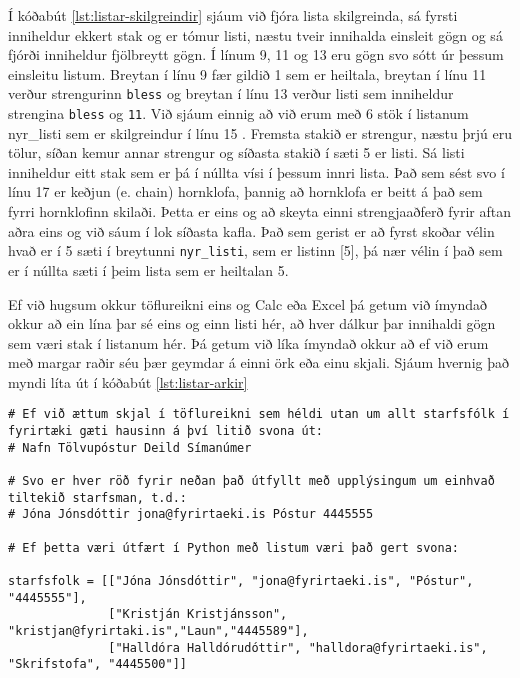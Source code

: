 Í kóðabút \ref{lst:listar-skilgreindir} sjáum við fjóra lista skilgreinda, sá fyrsti inniheldur ekkert stak og er tómur listi, næstu tveir innihalda einsleit gögn og sá fjórði inniheldur fjölbreytt gögn.
Í línum 9, 11 og 13 eru gögn svo sótt úr þessum einsleitu listum.
Breytan í línu 9 fær gildið 1 sem er heiltala, breytan í línu 11 verður strengurinn \texttt{bless} og breytan í línu 13 verður listi sem inniheldur strengina \texttt{bless} og \texttt{11}. 
Við sjáum einnig að við erum með 6 stök í listanum nyr\_listi sem er skilgreindur í línu 15 .
Fremsta stakið er strengur, næstu þrjú eru tölur, síðan kemur annar strengur og síðasta stakið í sæti 5 er listi.
Sá listi inniheldur eitt stak sem er þá í núllta vísi í þessum innri lista.
Það sem sést svo í línu 17 er keðjun (e. chain) hornklofa, þannig að hornklofa er beitt á það sem fyrri hornklofinn skilaði.
Þetta er eins og að skeyta einni strengjaaðferð fyrir aftan aðra eins og við sáum í lok síðasta kafla.
Það sem gerist er að fyrst skoðar vélin hvað er í 5 sæti í breytunni \texttt{nyr\_listi}, sem er listinn [5], þá nær vélin í það sem er í núllta sæti í þeim lista sem er heiltalan 5.

Ef við hugsum okkur töflureikni eins og Calc eða Excel þá getum við ímyndað okkur að ein lína þar sé eins og einn listi hér, að hver dálkur þar innihaldi gögn sem væri stak í listanum hér.
Þá getum við líka ímyndað okkur að ef við erum með margar raðir séu þær geymdar á einni örk eða einu skjali.
Sjáum hvernig það myndi líta út í kóðabút \ref{lst:listar-arkir}

\begin{lstlisting}[caption=Listar af listum, label=lst:listar-arkir]
# Ef við ættum skjal í töflureikni sem héldi utan um allt starfsfólk í fyrirtæki gæti hausinn á því litið svona út:
# Nafn Tölvupóstur Deild Símanúmer 

# Svo er hver röð fyrir neðan það útfyllt með upplýsingum um einhvað tiltekið starfsman, t.d.:
# Jóna Jónsdóttir jona@fyrirtaeki.is Póstur 4445555

# Ef þetta væri útfært í Python með listum væri það gert svona:

starfsfolk = [["Jóna Jónsdóttir", "jona@fyrirtaeki.is", "Póstur", "4445555"],
			  ["Kristján Kristjánsson", "kristjan@fyrirtaki.is","Laun","4445589"],
			  ["Halldóra Halldórudóttir", "halldora@fyrirtaeki.is", "Skrifstofa", "4445500"]]

\end{lstlisting}

